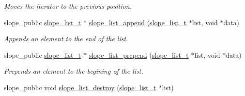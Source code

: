 \begin{DoxyCompactItemize}
\begin{DoxyCompactList}\small\item\em Moves the iterator to the previous position. \end{DoxyCompactList}\item 
slope\+\_\+public \hyperlink{group__List_ga88326d377deca937191acac6784bff0e}{slope\+\_\+list\+\_\+t} $\ast$ \hyperlink{group__List_ga44d52be6db2e8321a4a81fb481212f54}{slope\+\_\+list\+\_\+append} (\hyperlink{group__List_ga88326d377deca937191acac6784bff0e}{slope\+\_\+list\+\_\+t} $\ast$list, void $\ast$data)
\begin{DoxyCompactList}\small\item\em Appends an element to the end of the list. \end{DoxyCompactList}\item 
slope\+\_\+public \hyperlink{group__List_ga88326d377deca937191acac6784bff0e}{slope\+\_\+list\+\_\+t} $\ast$ \hyperlink{group__List_ga770e1a1761295088a2e769f10c50e9e7}{slope\+\_\+list\+\_\+prepend} (\hyperlink{group__List_ga88326d377deca937191acac6784bff0e}{slope\+\_\+list\+\_\+t} $\ast$list, void $\ast$data)
\begin{DoxyCompactList}\small\item\em Prepends an element to the begining of the list. \end{DoxyCompactList}\item 
\hypertarget{group__List_gad1f8ec4bc7db2daff96765ed708437b2}{slope\+\_\+public void \hyperlink{group__List_gad1f8ec4bc7db2daff96765ed708437b2}{slope\+\_\+list\+\_\+destroy} (\hyperlink{group__List_ga88326d377deca937191acac6784bff0e}{slope\+\_\+list\+\_\+t} $\ast$list)}\label{group__List_gad1f8ec4bc7db2daff96765ed708437b2}


\end{DoxyCompactItemize}
